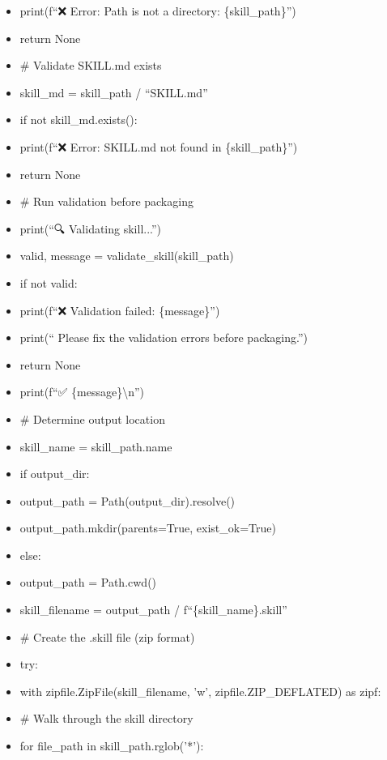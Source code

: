 \documentclass[11pt]{article}
\begin{document}
\begin{itemize}[leftmargin=*,itemsep=2pt,topsep=2pt]
\item {} print(f``❌ Error: Path is not a directory: \{skill\_\allowbreak{}path\}'')
\item {} return None
\item {} \# Validate SKILL.md exists
\item {} skill\_\allowbreak{}md = skill\_\allowbreak{}path / ``SKILL.md''
\item {} if not skill\_\allowbreak{}md.exists():
\item {} print(f``❌ Error: SKILL.md not found in \{skill\_\allowbreak{}path\}'')
\item {} return None
\item {} \# Run validation before packaging
\item {} print(``🔍 Validating skill...'')
\item {} valid, message = validate\_\allowbreak{}skill(skill\_\allowbreak{}path)
\item {} if not valid:
\item {} print(f``❌ Validation failed: \{message\}'')
\item {} print(`` Please fix the validation errors before packaging.'')
\item {} return None
\item {} print(f``✅ \{message\}\textbackslash{}n'')
\item {} \# Determine output location
\item {} skill\_\allowbreak{}name = skill\_\allowbreak{}path.name
\item {} if output\_\allowbreak{}dir:
\item {} output\_\allowbreak{}path = Path(output\_\allowbreak{}dir).resolve()
\item {} output\_\allowbreak{}path.mkdir(parents=True, exist\_\allowbreak{}ok=True)
\item {} else:
\item {} output\_\allowbreak{}path = Path.cwd()
\item {} skill\_\allowbreak{}filename = output\_\allowbreak{}path / f``\{skill\_\allowbreak{}name\}.skill''
\item {} \# Create the .skill file (zip format)
\item {} try:
\item {} with zipfile.ZipFile(skill\_\allowbreak{}filename, 'w', zipfile.ZIP\_\allowbreak{}DEFLATED) as zipf:
\item {} \# Walk through the skill directory
\item {} for file\_\allowbreak{}path in skill\_\allowbreak{}path.rglob('*'):

\end{itemize}
\end{document}
